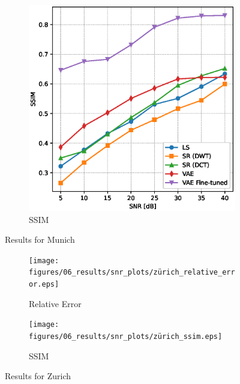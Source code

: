 \begin{figure}
\begin{subfigure}[b]{0.49\textwidth}
        \includegraphics[width=\textwidth]{figures/06_results/snr_plots/munich_ssim.eps}
        \caption{SSIM}
    \end{subfigure}
    \caption{Results for Munich}
\end{figure}

\begin{figure}
    \centering
    \begin{subfigure}[b]{0.49\textwidth}
        \texttt{[image: figures/06\_results/snr\_plots/zürich\_relative\_error.eps]}
        \caption{Relative Error}
    \end{subfigure}
    \begin{subfigure}[b]{0.49\textwidth}
        \texttt{[image: figures/06\_results/snr\_plots/zürich\_ssim.eps]}
        \caption{SSIM}
    \end{subfigure}
    \caption{Results for Zurich}
\end{figure}

